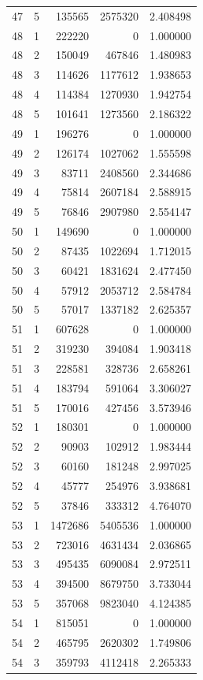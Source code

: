 \begin{longtable}{rrrrr}
47 & 5 & 135565 & 2575320 & 2.408498 \\
48 & 1 & 222220 & 0 & 1.000000 \\
48 & 2 & 150049 & 467846 & 1.480983 \\
48 & 3 & 114626 & 1177612 & 1.938653 \\
48 & 4 & 114384 & 1270930 & 1.942754 \\
48 & 5 & 101641 & 1273560 & 2.186322 \\
49 & 1 & 196276 & 0 & 1.000000 \\
49 & 2 & 126174 & 1027062 & 1.555598 \\
49 & 3 & 83711 & 2408560 & 2.344686 \\
49 & 4 & 75814 & 2607184 & 2.588915 \\
49 & 5 & 76846 & 2907980 & 2.554147 \\
50 & 1 & 149690 & 0 & 1.000000 \\
50 & 2 & 87435 & 1022694 & 1.712015 \\
50 & 3 & 60421 & 1831624 & 2.477450 \\
50 & 4 & 57912 & 2053712 & 2.584784 \\
50 & 5 & 57017 & 1337182 & 2.625357 \\
51 & 1 & 607628 & 0 & 1.000000 \\
51 & 2 & 319230 & 394084 & 1.903418 \\
51 & 3 & 228581 & 328736 & 2.658261 \\
51 & 4 & 183794 & 591064 & 3.306027 \\
51 & 5 & 170016 & 427456 & 3.573946 \\
52 & 1 & 180301 & 0 & 1.000000 \\
52 & 2 & 90903 & 102912 & 1.983444 \\
52 & 3 & 60160 & 181248 & 2.997025 \\
52 & 4 & 45777 & 254976 & 3.938681 \\
52 & 5 & 37846 & 333312 & 4.764070 \\
53 & 1 & 1472686 & 5405536 & 1.000000 \\
53 & 2 & 723016 & 4631434 & 2.036865 \\
53 & 3 & 495435 & 6090084 & 2.972511 \\
53 & 4 & 394500 & 8679750 & 3.733044 \\
53 & 5 & 357068 & 9823040 & 4.124385 \\
54 & 1 & 815051 & 0 & 1.000000 \\
54 & 2 & 465795 & 2620302 & 1.749806 \\
54 & 3 & 359793 & 4112418 & 2.265333 \\

\end{longtable}
